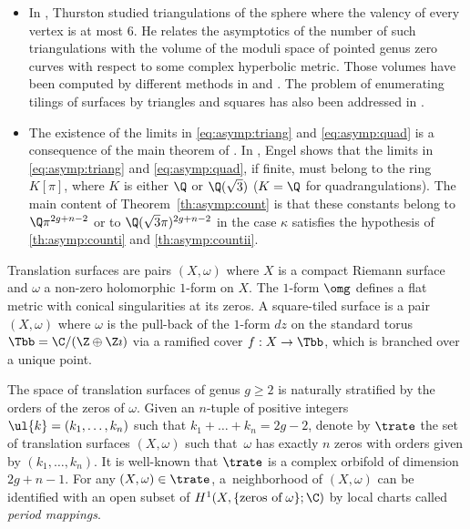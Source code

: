 \skpt
\begin{Remark}\label{rk:limit:known}
\begin{itemize}
\item
In \cite{Thurston98}, Thurston studied triangulations of the sphere where the valency of every vertex is at most $6$.
He relates the asymptotics of the number of such triangulations with the volume of the moduli space of pointed genus zero curves with respect to some complex hyperbolic metric. Those volumes have been computed by different methods in \cite{McMullen17} and \cite{KN18}.
The problem of enumerating tilings of surfaces by triangles and squares has also been addressed in \cite{ES18,Engel-I,Engel-II}.

\item The existence of the limits in \eqref{eq:asymp:triang} and \eqref{eq:asymp:quad} is a consequence of the main theorem of \cite{Ngu19}. In \cite{Engel-I}, Engel shows that the limits in \eqref{eq:asymp:triang} and \eqref{eq:asymp:quad}, if finite, must belong to the ring $K[\pi]$, where $K$ is either $\Q$ or $\Q(\sqrt{3})$ ($K=\Q$ for quadrangulations). The main content of Theorem~\ref{th:asymp:count} is that these constants belong to $\Q\pi^{2g+n-2}$ or to $\Q(\sqrt{3}\pi)^{2g+n-2}$ in the case $\kappa$ satisfies the hypothesis of \eqref{th:asymp:counti} and \eqref{th:asymp:countii}.
\end{itemize}
\end{Remark}

\label{sec:enum:sq:tiled}
Translation surfaces are pairs $(X,\omega)$ where $X$ is a compact Riemann surface and $\omega$ a non-zero holomorphic $1$-form on $X$. The $1$-form $\omg$ defines a flat metric with conical singularities at its zeros.
A square-tiled surface is a pair $(X,\omega)$ where $\omega$ is the pull-back of the $1$-form $dz$ on the standard torus $\Tbb=\C/(\Z\oplus\Z\imath)$ via a ramified cover $f: X\to \Tbb$, which is branched over a unique point.

The space of translation surfaces of genus $g\geq 2$ is naturally stratified by the orders of the zeros of $\omega$. Given an $n$-tuple of positive integers $\ul{k}=(k_1,\dots,k_n)$ such that \hbox{$k_1+\dots+k_n=2g-2$}, denote by $\trate$ the set of translation surfaces $(X,\omega)$ such that~$\omega$ has exactly $n$ zeros with orders given by $(k_1,\dots,k_n)$.
It is well-known that $\trate$ is a complex orbifold of dimension $2g+n-1$. For any $(X,\omega)\in \trate$, a~neighborhood of $(X,\omega)$ can be identified with an open subset of $H^1(X,\{\textrm{zeros of} \; \omega\}; \C)$ by local charts called \emph{period mappings}.

